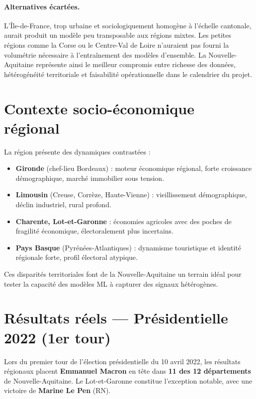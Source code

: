 \paragraph{Alternatives écartées.}
L'Île-de-France, trop urbaine et sociologiquement homogène à l'échelle cantonale,
aurait produit un modèle peu transposable aux régions mixtes. Les petites régions
comme la Corse ou le Centre-Val de Loire n'auraient pas fourni la volumétrie
nécessaire à l'entraînement des modèles d'ensemble. La Nouvelle-Aquitaine représente
ainsi le meilleur compromis entre richesse des données, hétérogénéité territoriale
et faisabilité opérationnelle dans le calendrier du projet.

\section{Contexte socio-économique régional}

La région présente des dynamiques contrastées :

\begin{itemize}
  \item \textbf{Gironde} (chef-lieu Bordeaux) : moteur économique régional, forte
    croissance démographique, marché immobilier sous tension.
  \item \textbf{Limousin} (Creuse, Corrèze, Haute-Vienne) : vieillissement démographique,
    déclin industriel, rural profond.
  \item \textbf{Charente, Lot-et-Garonne} : économies agricoles avec des poches
    de fragilité économique, électoralement plus incertains.
  \item \textbf{Pays Basque} (Pyrénées-Atlantiques) : dynamisme touristique et
    identité régionale forte, profil électoral atypique.
\end{itemize}

Ces disparités territoriales font de la Nouvelle-Aquitaine un terrain idéal pour
tester la capacité des modèles ML à capturer des signaux hétérogènes.

\section{Résultats réels --- Présidentielle 2022 (1er tour)}

Lors du premier tour de l'élection présidentielle du 10 avril 2022, les résultats
régionaux placent \textbf{Emmanuel Macron} en tête dans \textbf{11 des 12 départements}
de Nouvelle-Aquitaine. Le Lot-et-Garonne constitue l'exception notable, avec une
victoire de \textbf{Marine Le Pen} (RN).

